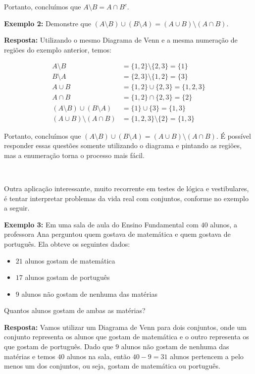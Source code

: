   Portanto, concluímos que $A \setminus B = A \cap B^c$.

  \textbf{Exemplo 2:} Demonstre que $(A \setminus B) \cup (B \setminus A) = (A \cup B) \setminus (A \cap B)$.

  \textbf{Resposta:} Utilizando o mesmo Diagrama de Venn e a mesma numeração de regiões do exemplo anterior, temos:

  \begin{equation*}
    \begin{aligned}
      A \setminus B &= \{1,2\} \setminus \{2,3\} = \{1\}\\
      B \setminus A &= \{2,3\} \setminus \{1,2\} = \{3\}\\
      A \cup B &= \{1,2\} \cup \{2,3\} = \{1,2,3\}\\
      A \cap B &= \{1,2\} \cap \{2,3\} = \{2\}\\
      (A \setminus B) \cup (B \setminus A) &= \{1\} \cup \{3\} = \{1,3\}\\
      (A \cup B) \setminus (A \cap B) &= \{1,2,3\} \setminus \{2\} = \{1,3\}
    \end{aligned}
  \end{equation*}

  Portanto, concluímos que $(A \setminus B) \cup (B \setminus A) = (A \cup B) \setminus (A \cap B)$.
  \newline
  É possível responder essas questões somente utilizando o diagrama e pintando as regiões, mas a enumeração torna o processo mais fácil.

  $\qquad$

  Outra aplicação interessante, muito recorrente em testes de lógica e vestibulares, é tentar interpretar problemas da vida real com conjuntos, conforme no exemplo a seguir.

  \textbf{Exemplo 3:} Em uma sala de aula do Ensino Fundamental com $40$ alunos, a professora Ana perguntou quem gostava de matemática e quem gostava de português. Ela obteve os seguintes dados:

  \begin{itemize}
    \item $21$ alunos gostam de matemática
    \item $17$ alunos gostam de português
    \item $9$ alunos não gostam de nenhuma das matérias
  \end{itemize}

  Quantos alunos gostam de ambas as matérias?

  \textbf{Resposta:} Vamos utilizar um Diagrama de Venn para dois conjuntos, onde um conjunto representa os alunos que gostam de matemática e o outro representa os que gostam de português.
  Dado que $9$ alunos não gostam de nenhuma das matérias e temos $40$ alunos na sala, então $40-9=31$ alunos pertencem a pelo menos um dos conjuntos, ou seja, gostam de matemática ou português.

